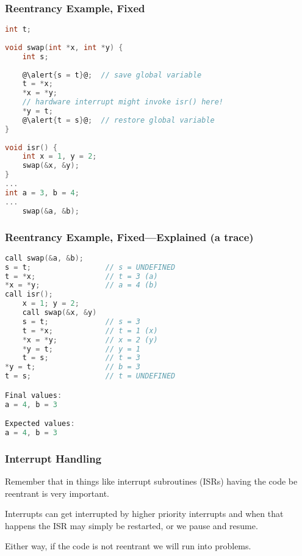 \begin{frame}[fragile]
  \frametitle{Reentrancy Example, Fixed}

  
  \begin{lstlisting}[language=C,escapechar=@]
int t;
 
void swap(int *x, int *y) {
    int s;
 
    @\alert{s = t}@;  // save global variable
    t = *x;
    *x = *y;
    // hardware interrupt might invoke isr() here!
    *y = t;
    @\alert{t = s}@;  // restore global variable
}
 
void isr() {
    int x = 1, y = 2;
    swap(&x, &y);
}
...
int a = 3, b = 4;
...
    swap(&a, &b);
  \end{lstlisting}
  
\end{frame}

\begin{frame}[fragile]
  \frametitle{Reentrancy Example, Fixed---Explained (a trace)}

  
  \begin{lstlisting}[language=C]
call swap(&a, &b);
s = t;                 // s = UNDEFINED
t = *x;                // t = 3 (a)
*x = *y;               // a = 4 (b)
call isr();
    x = 1; y = 2;
    call swap(&x, &y)
    s = t;             // s = 3
    t = *x;            // t = 1 (x)
    *x = *y;           // x = 2 (y)
    *y = t;            // y = 1
    t = s;             // t = 3
*y = t;                // b = 3
t = s;                 // t = UNDEFINED

Final values:
a = 4, b = 3

Expected values:
a = 4, b = 3
  \end{lstlisting}
  
\end{frame}

\begin{frame}
\frametitle{Interrupt Handling}


Remember that in things like interrupt subroutines (ISRs) having the code be reentrant is very important. 

Interrupts can get interrupted by higher priority interrupts and when that happens the ISR may simply be restarted, or we pause and resume.

Either way, if the code is not reentrant we will run into problems.


\end{frame}


